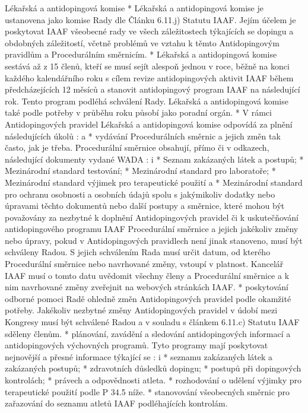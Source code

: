 Lékařská a antidopingová komise
* Lékařská a antidopingová komise je ustanovena jako komise Rady dle Článku 6.11.j) Statutu IAAF. Jejím účelem je poskytovat IAAF všeobecné rady ve všech záležitostech týkajících se dopingu a obdobných záležitostí, včetně problémů ve vztahu k těmto Antidopingovým pravidlům a  Procedurálním směrnicím.
* Lékařská a antidopingová komise sestává až z 15 členů, kteří se musí sejít alespoň jednou v roce, běžně na konci každého kalendářního roku s cílem revize antidopingových aktivit IAAF během předcházejících 12 měsíců a stanovit antidopingový program IAAF na následující rok. Tento program podléhá schválení Rady. Lékařská a antidopingová komise také podle potřeby v průběhu roku působí jako poradní orgán.
* V rámci Antidopingových pravidel Lékařská a antidopingová komise odpovídá za plnění následujících úkolů :
  \begitems \style a
  * vydávání Procedurálních směrnic a jejich změn tak často, jak je třeba. Procedurální směrnice obsahují, přímo či v odkazech, následující dokumenty vydané WADA :
    \begitems \style i
    * Seznam zakázaných látek a postupů;
    * Mezinárodní standard testování;
    * Mezinárodní standard pro laboratoře;
    * Mezinárodní standard výjimek pro terapeutické použití a
    * Mezinárodní standard pro ochranu osobnosti a osobních údajů
    spolu s jakýmikoliv dodatky nebo úpravami  těchto dokumentů nebo další postupy a směrnice, které mohou být považovány za nezbytné k doplnění Antidopingových pravidel či k uskutečňování antidopingového programu IAAF
    Procedurální směrnice a jejich jakékoliv změny nebo úpravy, pokud v Antidopingových pravidlech není jinak stanoveno, musí být schváleny Radou. S jejich schválením Rada musí určit datum, od kterého Procedurální směrnice nebo navrhované změny, vstoupí v platnost. Kancelář IAAF musí o tomto datu uvědomit všechny členy a Procedurální směrnice a k nim navrhované změny zveřejnit na webových stránkách IAAF.
    \enditems
  * poskytování odborné pomoci Radě ohledně změn Antidopingových pravidel podle okamžité potřeby. Jakékoliv nezbytné změny Antidopingových pravidel v údobí mezi Kongresy musí být schválené Radou a v souladu s článkem 6.11.c) Statutu IAAF sděleny členům.
  * plánování, zavádění a sledování antidopingových informací a antidopingových výchovných programů. Tyto programy mají poskytovat nejnovější a přesné informace týkající se :
    \begitems \style i
    * seznamu zakázaných látek a zakázaných postupů;
    * zdravotních důsledků dopingu;
    * postupů při dopingových kontrolách;
    * právech a odpovědnosti atleta.
    \enditems
  * rozhodování o udělení výjimky pro terapeutické použití podle P 34.5 níže.
  * stanovování všeobecných směrnic pro zařazování do seznamu atletů IAAF podléhajících kontrolám.
  \enditems

